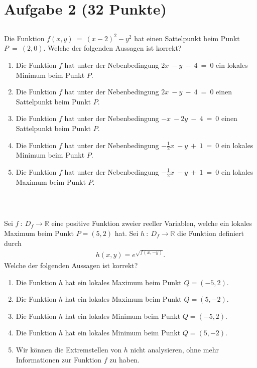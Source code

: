 \section*{Aufgabe 2 (32 Punkte)}
\vspace{0.4cm}
\subsection*{}
Die Funktion $ f(x,y) \ = \ (x-2)^2 -y^2 $ hat einen Sattelpunkt beim Punkt $ P \ = \ (2,0) $. Welche der folgenden Aussagen ist korrekt?
 \renewcommand{\labelenumi}{(\alph{enumi})}
\begin{enumerate}
\item Die Funktion $ f $ hat unter der Nebenbedingung $ 2x \ - y \ - \ 4 \ = \ 0 $ ein lokales Minimum beim Punkt $ P $.
\item Die Funktion $ f $ hat unter der Nebenbedingung $ 2x \ - y \ - \ 4 \ = \ 0 $ einen Sattelpunkt beim Punkt $ P $.
\item Die Funktion $ f $ hat unter der Nebenbedingung $ -x \ - 2y \ - \ 4 \ = \ 0 $ einen Sattelpunkt beim Punkt $ P $.
\item Die Funktion $ f $ hat unter der Nebenbedingung $ -\frac{1}{2}x \ - y \ + \ 1 \ = \ 0 $ ein lokales Minimum beim Punkt $ P $.
\item Die Funktion $ f $ hat unter der Nebenbedingung $ -\frac{1}{2}x \ - y \ + \ 1 \ = \ 0 $ ein lokales Maximum beim Punkt $ P $.
\end{enumerate}
\ \\
\subsection*{}
Sei $ f \ : \ D_f \to \mathbb{R} $ eine positive Funktion zweier reeller Variablen, welche ein lokales Maximum beim Punkt $ P = (5,2)  $ hat.
Sei $ h  \ : \ D_f \to \mathbb{R} $ die Funktion definiert durch
\begin{align*}
	h(x,y) = e^{\sqrt{f(x,-y)}}.
\end{align*} 
Welche der folgenden Aussagen ist korrekt?
\renewcommand{\labelenumi}{(\alph{enumi})}
\begin{enumerate}
\item Die Funktion $ h $ hat ein lokales Maximum beim Punkt $ Q = (-5,2). $
\item Die Funktion $ h $ hat ein lokales Maximum beim Punkt $ Q = (5,-2). $
\item Die Funktion $ h $ hat ein lokales Minimum beim Punkt $ Q = (-5,2). $
\item Die Funktion $ h $ hat ein lokales Minimum beim Punkt $ Q = (5,-2). $
\item Wir können die Extremstellen von $ h $ nicht analysieren, ohne mehr Informationen zur Funktion $ f $ zu haben.
\end{enumerate}
\newpage
